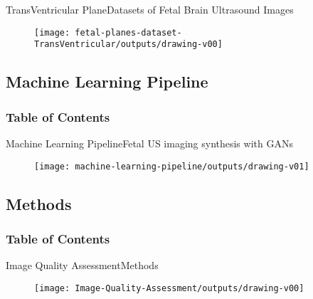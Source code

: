 {

\begin{frame}{TransVentricular Plane}{Datasets of Fetal Brain Ultrasound Images}
      \begin{figure}
        \centering
        \texttt{[image: fetal-planes-dataset-TransVentricular/outputs/drawing-v00]}
      \end{figure}
\end{frame}
}






\subsection{Machine Learning Pipeline}
\begin{frame}
  \frametitle{Table of Contents}
  \tableofcontents[currentsubsection]
\end{frame}

{
\begin{frame}{Machine Learning Pipeline}{Fetal US imaging synthesis with GANs}
      \begin{figure}
        \centering
        \texttt{[image: machine-learning-pipeline/outputs/drawing-v01]}
      \end{figure}
\end{frame}
}



\subsection{Methods}
\begin{frame}
  \frametitle{Table of Contents}
  \tableofcontents[currentsubsection]
\end{frame}


{
\begin{frame}{Image Quality Assessment}{Methods}
      \begin{figure}
        \centering
        \texttt{[image: Image-Quality-Assessment/outputs/drawing-v00]}
      \end{figure}
\end{frame}
}



